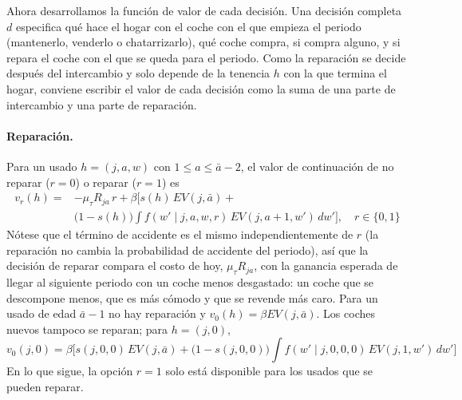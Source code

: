 \documentclass{article}
\begin{document}
Ahora desarrollamos la función de valor de cada decisión. Una decisión completa $d$ especifica qué hace el hogar con el coche con el que empieza el periodo (mantenerlo, venderlo o chatarrizarlo), qué coche compra, si compra alguno, y si repara el coche con el que se queda para el periodo. Como la reparación se decide después del intercambio y solo depende de la tenencia $h$ con la que termina el hogar, conviene escribir el valor de cada decisión como la suma de una parte de intercambio y una parte de reparación.

\paragraph{Reparación.} Para un usado $h=(j,a,w)$ con $1\le a\le\bar{a}-2$, el valor de continuación de no reparar ($r=0$) o reparar ($r=1$) es
$$\begin{aligned}
    v_r(h)= &-\mu_\tau R_{ja}\,r+\beta\Big[s(h)\,EV(j,\bar{a})+ \\
    & \big(1-s(h)\big)\textstyle\int f(w'\mid j,a,w,r)\,EV(j,a+1,w')\,dw'\Big],\quad r\in\{0,1\}
\end{aligned}$$
Nótese que el término de accidente es el mismo independientemente de $r$ (la reparación no cambia la probabilidad de accidente del periodo), así que la decisión de reparar compara el costo de hoy, $\mu_\tau R_{ja}$, con la ganancia esperada de llegar al siguiente periodo con un coche menos desgastado: un coche que se descompone menos, que es más cómodo y que se revende más caro. Para un usado de edad $\bar{a}-1$ no hay reparación y $v_0(h)=\beta EV(j,\bar{a})$. Los coches nuevos tampoco se reparan; para $h=(j,0)$,
$$v_0(j,0)=\beta\Big[s(j,0,0)\,EV(j,\bar{a})+\big(1-s(j,0,0)\big)\textstyle\int f(w'\mid j,0,0,0)\,EV(j,1,w')\,dw'\Big]$$
En lo que sigue, la opción $r=1$ solo está disponible para los usados que se pueden reparar.
\end{document}
